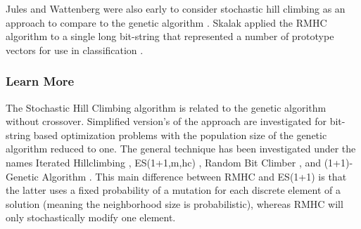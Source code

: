 Jules and Wattenberg were also early to consider stochastic hill climbing as an approach to compare to the genetic algorithm \cite{Juels1994}.
Skalak applied the RMHC algorithm to a single long bit-string that represented a number of prototype vectors for use in classification \cite{Skalak1994}.

% 
% 
\subsubsection{Learn More}
The Stochastic Hill Climbing algorithm is related to the genetic algorithm without crossover. Simplified version's of the approach are investigated for bit-string based optimization problems with the population size of the genetic algorithm reduced to one. The general technique has been investigated under the names Iterated Hillclimbing \cite{Muhlenbein1991}, ES(1+1,m,hc) \cite{Muhlenbein1992}, Random Bit Climber \cite{Davis1991}, and (1+1)-Genetic Algorithm \cite{Back1993}. This main difference between RMHC and ES(1+1) is that the latter uses a fixed probability of a mutation for each discrete element of a solution (meaning the neighborhood size is probabilistic), whereas RMHC will only stochastically modify one element.


